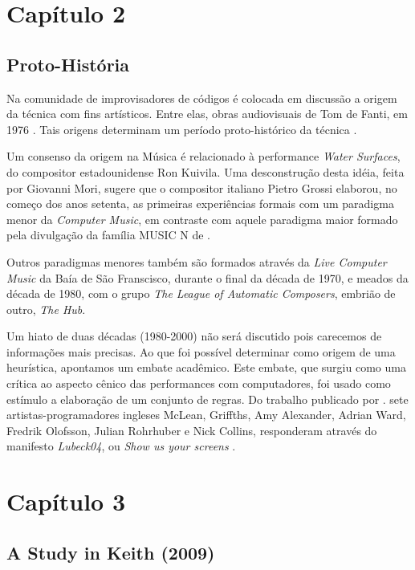 \section*{Capítulo 2}

\subsection*{Proto-História}

Na comunidade de improvisadores de códigos é colocada em discussão a origem da técnica com fins artísticos. Entre elas, obras audiovisuais de Tom de Fanti, em 1976 . Tais origens determinam um período proto-histórico da técnica \cite{ward_live_2004}. 

Um consenso da origem na Música é relacionado à performance \emph{Water Surfaces}, do compositor estadounidense Ron Kuivila. Uma desconstrução desta idéia, feita por Giovanni Mori, sugere que o compositor italiano Pietro Grossi elaborou, no começo dos anos setenta, as primeiras experiências formais com um paradigma menor da \emph{Computer Music}, em contraste com aquele paradigma maior formado pela divulgação da família MUSIC N de . 

Outros paradigmas menores também são formados através da \emph{Live Computer Music} da Baía de São Franscisco, durante o final da década de 1970, e meados da década de 1980, com o grupo \emph{The League of Automatic Composers}, embrião de outro, \emph{The Hub}.
 
Um hiato de duas décadas (1980-2000) não será discutido pois carecemos de informações mais precisas. Ao que foi possível determinar como origem de uma heurística, apontamos um embate acadêmico. Este embate, que surgiu como uma crítica ao aspecto cênico das performances com computadores, foi usado como estímulo a elaboração de um conjunto de regras. Do trabalho publicado por . sete artistas-programadores ingleses McLean, Griffths, Amy Alexander, Adrian Ward, Fredrik Olofsson, Julian Rohrhuber e Nick Collins, responderam através do manifesto \emph{Lubeck04}, ou \emph{Show us your screens}  \cite{ward_live_2004}.

\section*{Capítulo 3} 

\subsection*{A Study in Keith (2009)}

